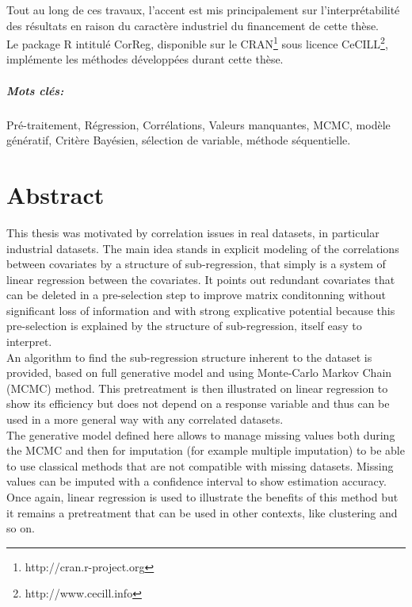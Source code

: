 \documentclass[12pt,a4paper]{report}
\begin{document}
	Tout au long de ces travaux, l'accent est mis principalement sur l'interprétabilité des résultats en raison du caractère industriel du financement de cette thèse. 
\\	

	Le package R intitulé CorReg, disponible sur le CRAN\footnote{http://cran.r-project.org} sous licence CeCILL\footnote{http://www.cecill.info}, implémente les méthodes développées durant cette thèse.
	
\paragraph{Mots clés:}Pré-traitement, Régression, Corrélations, Valeurs manquantes, MCMC, modèle génératif, Critère Bayésien, sélection de variable, méthode séquentielle.
\chapter*{Abstract}
	This thesis was motivated by correlation issues in real datasets, in particular industrial datasets. The main idea stands in explicit modeling of the correlations between covariates by a structure of sub-regression, that simply is a system of linear regression between the covariates. It points out redundant covariates that can be deleted in a pre-selection step to improve matrix conditonning without significant loss of information and with strong explicative potential because this pre-selection is explained by the structure of sub-regression, itself easy to interpret.
	\\
	
	An algorithm to find the sub-regression structure inherent to the dataset is provided, based on full generative model and using Monte-Carlo Markov Chain (MCMC) method. This pretreatment is then illustrated on linear regression to show its efficiency but does not depend on a response variable and thus can be used in a more general way with any correlated datasets.
	\\
	
	The generative model defined here allows to manage missing values both during the MCMC and then for imputation (for example multiple imputation) to be able to use classical methods that are not compatible with missing datasets. Missing values can be imputed with a confidence interval to show estimation accuracy. Once again, linear regression is used to illustrate the benefits of this method but it remains a pretreatment that can be used in other contexts, like clustering and so on.
	\\ 
	
\end{document}
